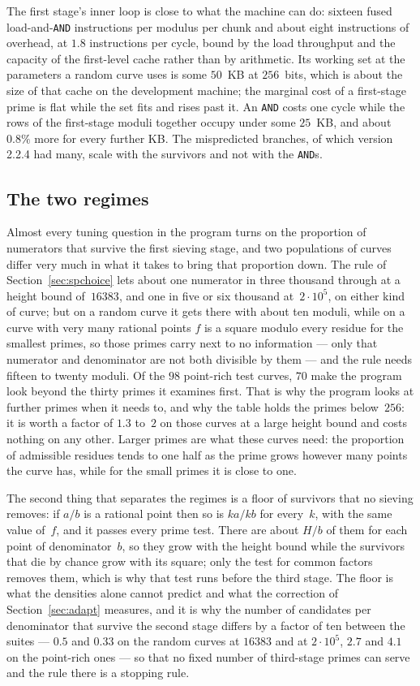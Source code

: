 \documentclass[12pt,a4paper,oneside]{amsart}
\begin{document}
The first stage's inner loop is close to what the machine can do: sixteen
fused load-and-\texttt{AND} instructions per modulus per chunk and about
eight instructions of overhead, at $1.8$ instructions per cycle, bound by
the load throughput and the capacity of the first-level cache rather than
by arithmetic. Its working set at the parameters a random curve uses is
some $50$~KB at $256$~bits, which is about the size of that cache on the
development machine; the marginal cost of a first-stage prime is flat while
the set fits and rises past it. An \texttt{AND} costs one cycle while the
rows of the first-stage moduli together occupy under some $25$~KB, and about
$0.8\%$ more for every further KB. The mispredicted branches, of which
version 2.2.4 had many, scale with the survivors and not with the
\texttt{AND}s.

\subsection{The two regimes}\label{app:regimes}

Almost every tuning question in the program turns on the proportion of
numerators that survive the first sieving stage, and two populations of
curves differ very much in what it takes to bring that proportion down. The
rule of Section~\ref{sec:spchoice} lets about one numerator in three
thousand through at a height bound of~$16383$, and one in five or six
thousand at~$2\cdot10^5$, on either kind of curve; but on a random curve it
gets there with about ten moduli, while on a curve with very many rational
points $f$ is a square modulo every residue for the smallest primes, so
those primes carry next to no information --- only that numerator and
denominator are not both divisible by them --- and the rule needs
fifteen to twenty moduli. Of the $98$ point-rich test curves, $70$ make the
program look beyond the thirty primes it examines first. That is
why the program looks at further primes when it needs to, and why the table
holds the primes below~$256$: it is worth a factor of $1.3$ to~$2$ on those
curves at a large height bound and costs nothing on any other. Larger
primes are what these curves need: the proportion of admissible residues
tends to one half as the prime grows however many points the curve has,
while for the small primes it is close to one.

The second thing that separates the regimes is a floor of survivors that
no sieving removes: if $a/b$ is a rational point then so is $ka/kb$ for
every~$k$, with the same value of~$f$, and it passes every prime test. There
are about $H/b$ of them for each point of denominator~$b$, so they grow
with the height bound while the survivors that die by chance grow with its
square; only the test for common factors removes them, which is why that
test runs before the third stage. The floor is what the densities alone
cannot predict and what the correction of Section~\ref{sec:adapt} measures,
and it is why the number of candidates per denominator that survive the
second stage differs by a factor of ten between the suites --- $0.5$ and
$0.33$ on the random curves at $16383$ and at $2\cdot10^5$, $2.7$ and $4.1$
on the point-rich ones --- so that no fixed number of third-stage primes can
serve and the rule there is a stopping rule.
\end{document}
